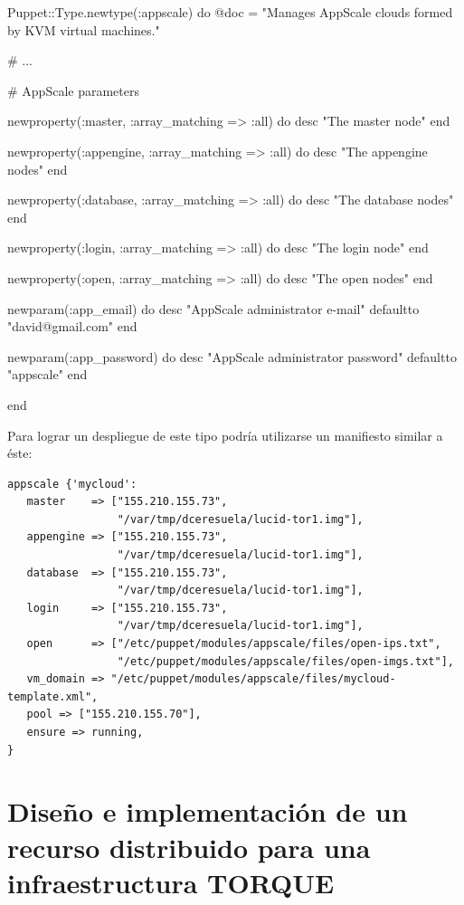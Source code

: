 \begin{rubycode}
Puppet::Type.newtype(:appscale) do
   @doc = "Manages AppScale clouds formed by KVM virtual machines."
   
   # ...

   # AppScale parameters
   
   newproperty(:master, :array_matching => :all) do
      desc "The master node"
   end

   newproperty(:appengine, :array_matching => :all) do
      desc "The appengine nodes"
   end

   newproperty(:database, :array_matching => :all) do
      desc "The database nodes"
   end

   newproperty(:login, :array_matching => :all) do
      desc "The login node"
   end

   newproperty(:open, :array_matching => :all) do
      desc "The open nodes"
   end
   

   newparam(:app_email) do
      desc "AppScale administrator e-mail"
      defaultto "david@gmail.com"
   end
   
   newparam(:app_password) do
      desc "AppScale administrator password"
      defaultto "appscale"
   end

end
\end{rubycode}

Para lograr un despliegue de este tipo podría utilizarse un manifiesto similar a éste:

\begin{lstlisting}
appscale {'mycloud':
   master    => ["155.210.155.73",
                 "/var/tmp/dceresuela/lucid-tor1.img"],
   appengine => ["155.210.155.73",
                 "/var/tmp/dceresuela/lucid-tor1.img"],
   database  => ["155.210.155.73",
                 "/var/tmp/dceresuela/lucid-tor1.img"],
   login     => ["155.210.155.73",
                 "/var/tmp/dceresuela/lucid-tor1.img"],
   open      => ["/etc/puppet/modules/appscale/files/open-ips.txt",
                 "/etc/puppet/modules/appscale/files/open-imgs.txt"],
   vm_domain => "/etc/puppet/modules/appscale/files/mycloud-template.xml",
   pool => ["155.210.155.70"],
   ensure => running,
}
\end{lstlisting}


\section{Diseño e implementación de un recurso distribuido para una infraestructura TORQUE}

